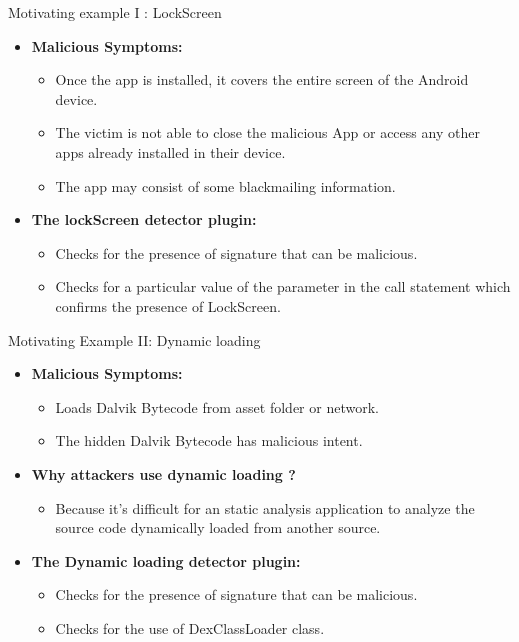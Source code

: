 \documentclass[final,hyperref={pdfpagelabels=false}]{beamer}
\begin{document}
\begin{frame}[t]
\begin{columns}[t]
\begin{column}{.465\textwidth}
\begin{block}{Motivating example I : LockScreen}
\begin{itemize}
\item \textbf{Malicious Symptoms:}
    \begin{itemize}
    \item Once the app is installed, it covers the entire screen of the Android device. 
    \item The victim is not able to close the malicious App or access any other apps already installed in their device. 
    \item The app may consist of some blackmailing information. 
  \end{itemize}
\item \textbf{The lockScreen detector plugin:} 
\begin{itemize}
\item Checks for the presence of signature that can be malicious. 
\item Checks for a particular value of the parameter in the call statement which confirms the presence of LockScreen.
\end{itemize}
\end{itemize}  
\end{block}


\begin{block}{Motivating Example II:  Dynamic loading}
\begin{itemize}
\item \textbf{Malicious Symptoms:}
    \begin{itemize}
    \item Loads Dalvik Bytecode from asset folder or network. 
    \item The hidden Dalvik Bytecode has malicious intent. 
  \end{itemize}
  \item \textbf{Why attackers use dynamic loading ?}
    \begin{itemize}
    \item Because it's difficult for an static analysis application to analyze the source code dynamically loaded from another source. 
  \end{itemize}
\item \textbf{The Dynamic loading detector plugin:} 
\begin{itemize}
\item Checks for the presence of signature that can be malicious. 
\item Checks for the use of DexClassLoader class. 
\end{itemize}
\end{itemize}  
\end{block}


\end{column}
\end{columns}
\end{frame}
\end{document}
